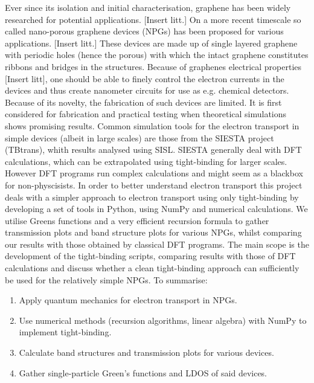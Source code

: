 Ever since its isolation and initial characterisation, graphene has been widely researched for potential applications. [Insert litt.] On a more recent timescale so called nano-porous graphene devices (NPGs) has been proposed for various applications. [Insert litt.] These devices are made up of single layered graphene with periodic holes (hence the porous) with which the intact graphene constitutes ribbons and bridges in the structures. Because of graphenes electrical properties [Insert litt], one should be able to finely control the electron currents in the devices and thus create nanometer circuits for use as e.g. chemical detectors. Because of its novelty, the fabrication of such devices are limited. It is first considered for fabrication and practical testing when theoretical simulations shows promising results. Common simulation tools for the electron transport in simple devices (albeit in large scales) are those from the SIESTA project (TBtrans), whith results analysed using SISL\cite{zerothi_sisl}. SIESTA generally deal with DFT calculations, which can be extrapolated using tight-binding for larger scales\cite{calogero_electron_2019}. However DFT programs run complex calculations and might seem as a blackbox for non-physcisists. In order to better understand electron transport this project deals with a simpler approach to electron transport using only tight-binding by developing a set of tools in Python, using NumPy and numerical calculations. We utilise Greens functions and a very efficient recursion formula to gather transmission plots and band structure plots for various NPGs, whilst comparing our results with those obtained by classical DFT programs. The main scope is the development of the tight-binding scripts, comparing results with those of DFT calculations and discuss whether a clean tight-binding approach can sufficiently be used for the relatively simple NPGs.
To summarise:
\begin{enumerate}
    \item Apply quantum mechanics for electron transport in NPGs.
    \item Use numerical methods (recursion algorithms, linear algebra) with NumPy to implement tight-binding.
    \item Calculate band structures and transmission plots for various devices.
    \item Gather single-particle Green’s functions and LDOS of said devices.
\end{enumerate}
